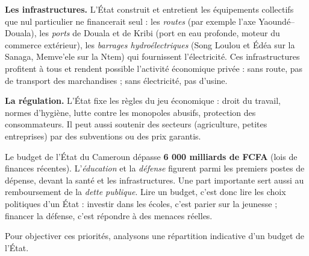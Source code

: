 \documentclass[11pt]{article}
\begin{document}
\textbf{Les infrastructures.} L'État construit et entretient les équipements collectifs que nul particulier ne financerait seul : les \emph{routes} (par exemple l'axe Yaoundé--Douala), les \emph{ports} de Douala et de Kribi (port en eau profonde, moteur du commerce extérieur), les \emph{barrages hydroélectriques} (Song Loulou et Édéa sur la Sanaga, Memve'ele sur la Ntem) qui fournissent l'électricité. Ces infrastructures profitent à tous et rendent possible l'activité économique privée : sans route, pas de transport des marchandises ; sans électricité, pas d'usine.

\textbf{La régulation.} L'État fixe les règles du jeu économique : droit du travail, normes d'hygiène, lutte contre les monopoles abusifs, protection des consommateurs. Il peut aussi soutenir des secteurs (agriculture, petites entreprises) par des subventions ou des prix garantis.

\begin{exemplebox}
Le budget de l'État du Cameroun dépasse \textbf{6 000 milliards de FCFA} (lois de finances récentes). L'\emph{éducation} et la \emph{défense} figurent parmi les premiers postes de dépense, devant la santé et les infrastructures. Une part importante sert aussi au remboursement de la \emph{dette publique}. Lire un budget, c'est donc lire les choix politiques d'un État : investir dans les écoles, c'est parier sur la jeunesse ; financer la défense, c'est répondre à des menaces réelles.
\end{exemplebox}

Pour objectiver ces priorités, analysons une répartition indicative d'un budget de l'État.
\end{document}
